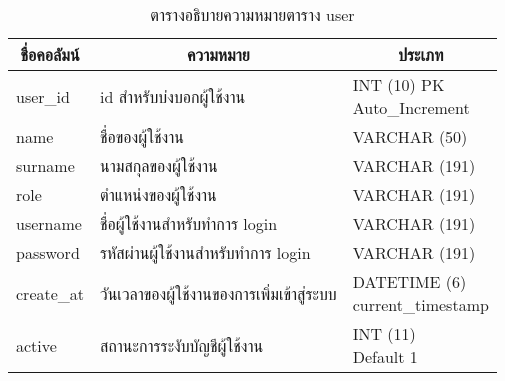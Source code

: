 \begin{table}[H]
\caption{ตารางอธิบายความหมายตาราง user}\label{tbl:user}
\begin{tabular}{|l|l|l|}
\hline
\multicolumn{1}{|c|}{ชื่อคอลัมน์} & \multicolumn{1}{c|}{ความหมาย}             & \multicolumn{1}{c|}{ประเภท}                                     \\ \hline
user\_id                          & id   สำหรับบ่งบอกผู้ใช้งาน                & \makecell[l]{INT   (10) PK\\    Auto\_Increment}     \\ \hline
name                              & ชื่อของผู้ใช้งาน                          & VARCHAR   (50)                                                                    \\ \hline
surname                           & นามสกุลของผู้ใช้งาน                       & VARCHAR   (191)                                                                   \\ \hline
role                              & ตำแหน่งของผู้ใช้งาน                       & VARCHAR   (191)                                                                   \\ \hline
username                          & ชื่อผู้ใช้งานสำหรับทำการ   login          & VARCHAR   (191)                                                                   \\ \hline
password                          & รหัสผ่านผู้ใช้งานสำหรับทำการ   login      & VARCHAR   (191)                                                                   \\ \hline
create\_at                        & วันเวลาของผู้ใช้งานของการเพิ่มเข้าสู่ระบบ & \makecell[l]{DATETIME   (6) \\ current\_timestamp} \\ \hline
active                            & สถานะการระงับบัญชีผู้ใช้งาน               & \makecell[l]{INT   (11) \\ Default 1}             \\ \hline
\end{tabular}
\end{table}

